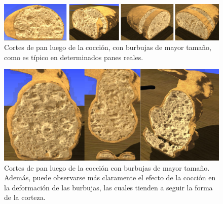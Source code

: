 \begin{figure}[!ht]
\begin{center}
\includegraphics[width=13cm]{figures/baked}
\caption[Cortes de pan luego de la cocción, con burbujas de mayor tamaño]{Cortes de pan luego de la cocción, con burbujas de mayor tamaño, como es típico en determinados panes reales.}
\label{fg:bigalveoli}
\end{center}
\end{figure}

\begin{figure}[!ht]
\begin{center}
\includegraphics[width=13cm]{figures/bakedbunny}
\caption[Efecto de la cocción sobre el pan sintético.]{Cortes de pan luego de la cocción con burbujas de mayor tamaño. Además, puede observarse más claramente el efecto de la cocción en la deformación de las burbujas, las cuales tienden a seguir la forma de la corteza.}
\label{fg:bakedbunny}
\end{center}
\end{figure}






